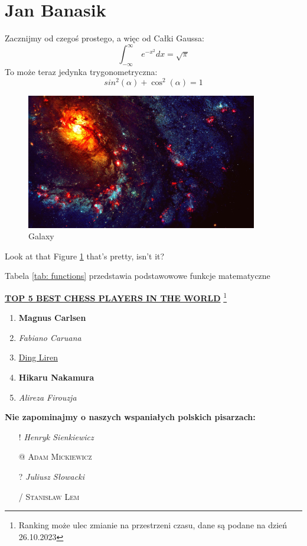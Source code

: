 \section{Jan Banasik}
\label{sec: jbanasik}

Zacznijmy od czegoś prostego, a więc od Całki Gaussa:
\[ \int_{-\infty}^{\infty}\ e^{-x^2} dx = \sqrt{\pi} \]
To może teraz jedynka trygonometryczna: \[ sin^{2}(\alpha) + \cos^{2}(\alpha)= 1 \]

\begin{figure}[h!]
    \centering
    \includegraphics[width = 0.9\textwidth]{pictures/galaxy.jpg}
    \caption{Galaxy}
    \label{fig:galaxy}
\end{figure}

Look at that Figure \ref{fig:galaxy} that's pretty, isn't it? 



Tabela \ref{tab: functions} przedstawia podstawowowe funkcje matematyczne 
\newpage

\href{https://www.chess.com/players}{\textbf{TOP 5 BEST CHESS PLAYERS IN THE WORLD}} \footnote{Ranking może ulec zmianie na przestrzeni czasu, dane są podane na dzień 26.10.2023}
\begin{enumerate}
    \item  \textbf{Magnus Carlsen}
    \item  \textit{Fabiano Caruana}
    \item  \underline{Ding Liren}
    \item  \textbf{Hikaru Nakamura}
    \item  \textit{Alireza Firouzja} \newline\newline
\end{enumerate}



\textbf{Nie zapominajmy o naszych wspaniałych polskich pisarzach:}
\begin{itemize}
    \item[!] \emph{Henryk Sienkiewicz}
    \item[@] \textsc{Adam Mickiewicz}
    \item[?] \emph{Juliusz Słowacki}
    \item[/] \textsc{Stanisław Lem} \\
\end{itemize}

